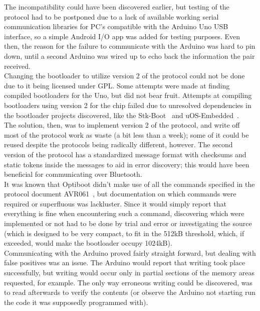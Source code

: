 	The incompatibility could have been discovered earlier, but testing of the protocol had to be postponed due to a lack of available working serial communication libraries for PC's compatible with the Arduino Uno USB interface, so a simple Android I/O app was added for testing purposes. Even then, the reason for the failure to communicate with the Arduino was hard to pin down, until a second Arduino was wired up to echo back the information the pair received.\\

	Changing the bootloader to utilize version 2 of the protocol could not be done due to it being licensed under GPL. Some attempts were made at finding compiled bootloaders for the Uno, but did not bear fruit. Attempts at compiling bootloaders using version 2 for the chip failed due to unresolved dependencies in the bootloader projects discovered, like the Stk-Boot~\cite{StkBoot} and uOS-Embedded~\cite{uOS-Embedded}.\\

	The solution, then, was to implement version 2 of the protocol, and write off most of the protocol work as waste (a bit less than a week); some of it could be reused despite the protocols being radically different, however. The second version of the protocol has a standardized message format with checksums and static tokens inside the messages to aid in error discovery; this would have been beneficial for communicating over Bluetooth.\\

	It was known that Optiboot didn't make use of all the commands specified in the protocol document AVR061~\cite{AVR061}, but documentation on which commands were required or superfluous was lackluster. Since it would simply report that everything is fine when encountering such a command, discovering which were implemented or not had to be done by trial and error or investigating the source (which is designed to be very compact, to fit in the 512kB threshold, which, if exceeded, would make the bootloader occupy 1024kB).\\

	Communicating with the Arduino proved fairly straight forward, but dealing with false positives was an issue.
	The Arduino would report that writing took place successfully, but writing would occur only in partial sections of the memory areas requested, for example. The only way erroneous writing could be discovered, was to read afterwards to verify the contents (or observe the Arduino not starting run the code it was supposedly programmed with).\\

